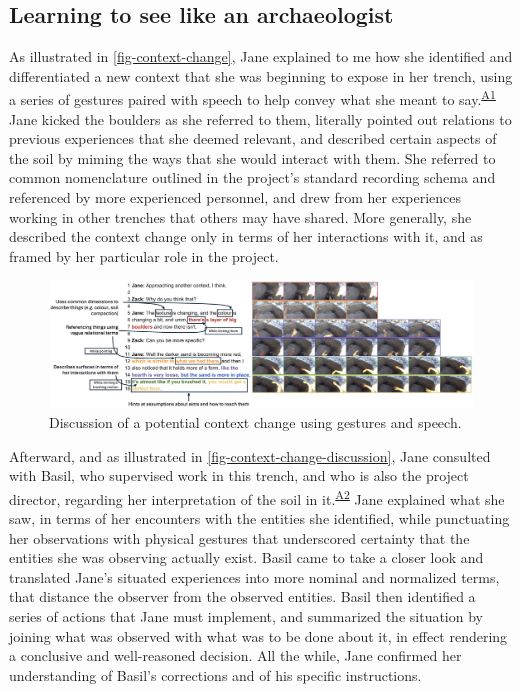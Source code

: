 \documentclass{article}
\begin{document}
\subsection{Learning to see like an
archaeologist}\label{learning-to-see-like-an-archaeologist}

As illustrated in \autoref{fig-context-change}, Jane explained to me
how she identified and differentiated a new context that she was
beginning to expose in her trench, using a series of gestures paired
with speech to help convey what she meant to
say.\textsuperscript{\hyperref[sec-A1]{A1}} Jane kicked the boulders as
she referred to them, literally pointed out relations to previous
experiences that she deemed relevant, and described certain aspects of
the soil by miming the ways that she would interact with them. She
referred to common nomenclature outlined in the project's standard
recording schema and referenced by more experienced personnel, and drew
from her experiences working in other trenches that others may have
shared. More generally, she described the context change only in terms
of her interactions with it, and as framed by her particular role in the
project.

\begin{figure}
\centering
\includegraphics[width=6in]{../figures/context-change-annotated.png}
\caption{Discussion of a potential context change using gestures and
speech.}\label{fig-context-change}
\end{figure}


Afterward, and as illustrated in
\autoref{fig-context-change-discussion}, Jane consulted with Basil, who
supervised work in this trench, and who is also the project director,
regarding her interpretation of the soil in
it.\textsuperscript{\hyperref[sec-A2]{A2}} Jane explained what she saw,
in terms of her encounters with the entities she identified, while
punctuating her observations with physical gestures that underscored
certainty that the entities she was observing actually exist. Basil came
to take a closer look and translated Jane's situated experiences into
more nominal and normalized terms, that distance the observer from the
observed entities. Basil then identified a series of actions that Jane
must implement, and summarized the situation by joining what was
observed with what was to be done about it, in effect rendering a
conclusive and well-reasoned decision. All the while, Jane confirmed her
understanding of Basil's corrections and of his specific instructions.
\end{document}
